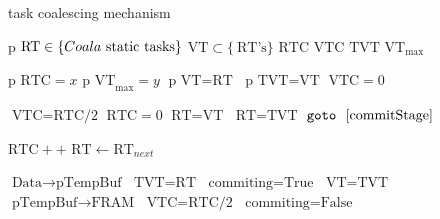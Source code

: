 \begin{algorithm}[t]
	\caption{\sys task coalescing mechanism}
	\label{algo:coalescing}
	\scriptsize
	\begin{algorithmic}[1]
		\State $\text{p}$  
		\State $\text{RT} \in \{Coala~\text{static tasks}\}$  
		\State $\text{VT} \subset \{~\text{RT's}\}$  
		\State $\text{RTC}$  
		\State $\text{VTC}$  
		\State $\text{TVT}$ 
		\State $\text{VT}_{\max}$ 
		\vspace{0.1cm}
		
		\State $\text{p RTC} = x $ 
		\State $\text{p VT}_{\max} = y$
		\State $\text{p VT} = \text{RT}$ 
		\State $\text{p TVT} = \text{VT} $ 
		\State $\text{VTC} = 0 $ 
		\vspace{0.1cm}


			\State $\text{VTC} = \text{RTC/2} $  \label{algo:coalescing:executionHistory1}
			\State $\text{RTC} = 0 $
			\State $\text{RT} = \text{VT}$  \label{algo:coalescing:virtualProgressing1}
				\State $\text{RT}=\text{TVT}$
				\State $\texttt{goto} \ \ \ref{commitStage}$ \label{algo:coalescing:firmTransition1}
			\EndIf
			\vspace{0.1cm}

					\EndFunction
						\State $\text{RTC}++$  \label{algo:coalescing:realTaskCounter}
					\EndIf
					\State $\text{RT} \leftarrow \text{RT}_{next}$ 
				\EndWhile        \label{algo:coalescing:virtualProgressing2}

				\State {}
				\State $\text{Data} \rightarrow \text{pTempBuf}$ 
				\State $\text{TVT} = \text{RT}$ 
				\State $\text{commiting} = \text{True}$ \label{algo:coalescing:firmTransition2}
				\State 
				\State $\text{VT} = \text{TVT}$ \label{commitStage}
				\State $\text{pTempBuf} \rightarrow \text{FRAM}$ 
				\State $\text{VTC} = \text{RTC/2}$ 		 \label{algo:coalescing:executionHistory2}
				\State $\text{commiting} = \text{False}$ 

			\EndWhile

		\EndFunction
			
	\end{algorithmic}
\end{algorithm}

